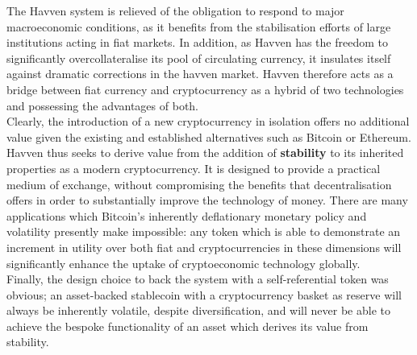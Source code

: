 \noindent The Havven system is relieved of the obligation to respond to major macroeconomic conditions, 
as it benefits from the stabilisation efforts of large institutions acting in fiat markets.
In addition, as Havven has the freedom to significantly overcollateralise its pool of circulating currency, it
insulates itself against dramatic corrections in the havven market.
Havven therefore acts as a bridge between fiat currency and cryptocurrency as a hybrid of two technologies and possessing
the advantages of both. \\

\noindent Clearly, the introduction of a new cryptocurrency in isolation offers no additional value given
the existing and established alternatives such as Bitcoin or Ethereum. Havven thus seeks to derive value
from the addition of \textbf{stability} to its inherited properties as a modern cryptocurrency.
It is designed to provide a practical medium of exchange, without compromising the benefits that
decentralisation offers in order to substantially improve the technology of money.
There are many applications which Bitcoin's inherently deflationary monetary policy and
volatility presently make impossible: any token which is able to demonstrate an increment
in utility over both fiat and cryptocurrencies in these dimensions  will significantly
enhance the uptake of cryptoeconomic technology globally. \\

\noindent Finally, the design choice to back the system with a self-referential token was obvious; an asset-backed stablecoin with a cryptocurrency basket as reserve will always be inherently volatile, despite diversification, and will never be able to achieve the bespoke functionality of an asset which derives its value from stability.

\pagebreak
